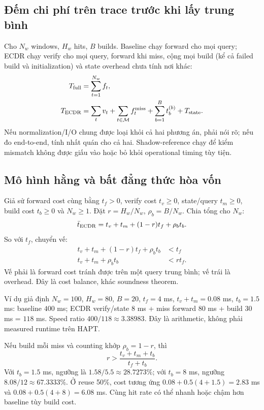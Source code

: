 \documentclass[11pt,a4paper]{article}
\theoremstyle{definition}
\begin{document}
\subsection{Đếm chi phí trên trace trước khi lấy trung bình}
Cho $N_w$ windows, $H_w$ hits, $B$ builds. Baseline chạy forward cho mọi
query; ECDR chạy verify cho mọi query, forward khi miss, cộng mọi build
(kể cả failed build và initialization) và state overhead chưa tính nơi khác:
\begin{align}
T_{\rm full}&=\sum_{t=1}^{N_w}f_t,\\
T_{\rm ECDR}&=\sum_tv_t+\sum_{t\in\mathcal M}f_t^{\rm miss}
+\sum_{b=1}^Bt_b^{(b)}+T_{\rm state}.
\end{align}
Nếu normalization/I/O chung được loại khỏi cả hai phương án, phải nói rõ;
nếu đo end-to-end, tính nhất quán cho cả hai. Shadow-reference chạy để
kiểm mismatch không được giấu vào hoặc bỏ khỏi operational timing tùy tiện.

\subsection{Mô hình hằng và bất đẳng thức hòa vốn}
Giả sử forward cost cùng bằng $t_f>0$, verify cost $t_v\ge0$,
state/query $t_m\ge0$, build cost $t_b\ge0$ và $N_w\ge1$.
Đặt $r=H_w/N_w$, $\rho_b=B/N_w$. Chia tổng cho $N_w$:
\begin{equation}
\bar t_{\rm ECDR}=t_v+t_m+(1-r)t_f+\rho_b t_b.
\end{equation}
So với $t_f$, chuyển vế:
\begin{align}
t_v+t_m+(1-r)t_f+\rho_b t_b&<t_f\\
t_v+t_m+\rho_b t_b&<rt_f.
\end{align}
Vế phải là forward cost tránh được trên một query trung bình; vế trái là
overhead. Đây là cost balance, khác soundness theorem.

Ví dụ giả định $N_w=100$, $H_w=80$, $B=20$, $t_f=4$ ms,
$t_v+t_m=0.08$ ms, $t_b=1.5$ ms: baseline $400$ ms;
ECDR verify/state $8$ ms + miss forward $80$ ms + build $30$ ms =
$118$ ms. Speed ratio $400/118\approx3.38983$. Đây là arithmetic,
không phải measured runtime trên HAPT.

Nếu build mỗi miss và counting khớp $\rho_b=1-r$, thì
\begin{equation}
r>\frac{t_v+t_m+t_b}{t_f+t_b}.
\end{equation}
Với $t_b=1.5$ ms, ngưỡng là $1.58/5.5\approx28.7273\%$;
với $t_b=8$ ms, ngưỡng $8.08/12\approx67.3333\%$. Ở reuse 50\%, cost
tương ứng $0.08+0.5(4+1.5)=2.83$ ms và $0.08+0.5(4+8)=6.08$ ms.
Cùng hit rate có thể nhanh hoặc chậm hơn baseline tùy build cost.
\end{document}
